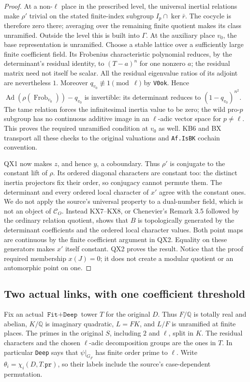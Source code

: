 \begin{proof}
At a non-$\ell$ place in the prescribed level, the universal
inertial relations make $\rho'$ trivial on the stated finite-index
subgroup $I_p\cap\ker\bar r$.  The cocycle is therefore zero there;
averaging over the remaining finite quotient makes its class
unramified.  Outside the level this is built into $\Gamma$.
At the auxiliary place $v_0$, the base representation is
unramified.  Choose a stable lattice over a sufficiently large
finite coefficient field.  Its Frobenius characteristic
polynomial reduces, by the determinant's residual identity,
to $(T-a)^n$ for one nonzero $a$; the residual matrix need not
itself be scalar.  All the residual eigenvalue ratios of its
adjoint are nevertheless $1$.  Moreover
$q_{v_0}\not\equiv1\pmod\ell$ by \texttt{V0ok}.  Hence
$\operatorname{Ad}(\rho(\operatorname{Frob}_{v_0}))-q_{v_0}$
is invertible: its determinant reduces to
$(1-q_{v_0})^{n^2}$.  The tame relation forces the infinitesimal
inertia value to be zero; the wild pro-$p$ subgroup has no
continuous additive image in an $\ell$-adic vector space for
$p\ne\ell$.  This proves the required unramified condition at
$v_0$ as well.  KB6 and BX transport all these checks to the
original valuations and \texttt{Af.IsBK} cochain convention.

QX1 now makes $z$, and hence $y$, a coboundary.  Thus $\rho'$ is
conjugate to the constant lift of $\rho$.  Its ordered diagonal
characters are constant too: the distinct inertia projectors
fix their order, so conjugacy cannot permute them.  The determinant
and every ordered local character of $x'$ agree with the constant
ones.  We do not apply the source's universal property to a
dual-number field, which is not an object of $\mathcal C_O$.
Instead KX7--KX8, or Chenevier's Remark 3.5 followed by the
ordinary relation quotient, shows that $B$ is topologically
generated by the determinant coefficients and the ordered
local character values.  Both point maps are continuous by
the finite coefficient argument in QX2.  Equality on these
generators makes $x'$ itself constant.
QX2 proves the result.  Notice that the proof required membership
$x(J)=0$; it does not create a modular quotient or an automorphic
point on one.
\end{proof}

\subsection{Two actual links, with one coefficient threshold}

Fix an actual $\texttt{Fit}+\texttt{Deep}$ tower $T$ for the
original $D$.  Thus $F/\mathbb Q$ is totally real and abelian,
$K/\mathbb Q$ is imaginary quadratic, $L=FK$, and $L/F$ is
unramified at finite places.  The primes in the original $S$,
including $2$ and $\ell$, split in $K$.  The residual characters
and the chosen $\ell$-adic decomposition groups are the ones
in $T$.  In particular \texttt{Deep} says that
$\psi|_{G_F}$ has finite order prime to $\ell$.
Write $\theta_i=\chi_i(D,T.\texttt{pr})$, so their labels include
the source's case-dependent permutation.

